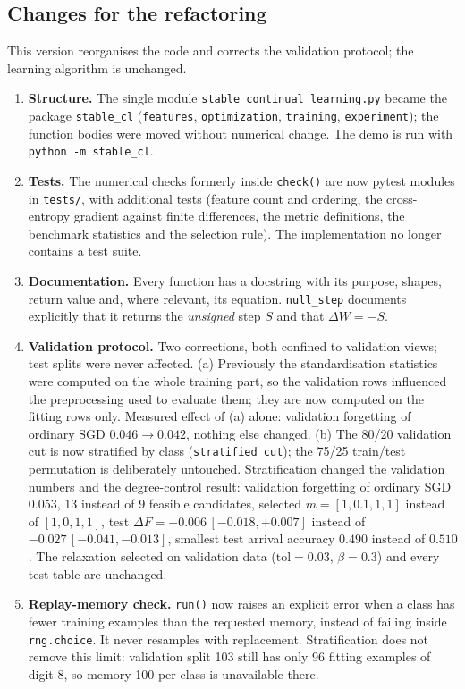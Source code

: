 \documentclass[11pt,a4paper]{article}
\newcommand{\code}[1]{\texttt{#1}}
\begin{document}
\subsection{Changes for the refactoring}

This version reorganises the code and corrects the validation protocol; the learning algorithm is unchanged.
\begin{enumerate}
\item \textbf{Structure.} The single module \code{stable\_continual\_learning.py} became the package \code{stable\_cl} (\code{features}, \code{optimization}, \code{training}, \code{experiment}); the function bodies were moved without numerical change. The demo is run with \code{python -m stable\_cl}.
\item \textbf{Tests.} The numerical checks formerly inside \code{check()} are now pytest modules in \code{tests/}, with additional tests (feature count and ordering, the cross-entropy gradient against finite differences, the metric definitions, the benchmark statistics and the selection rule). The implementation no longer contains a test suite.
\item \textbf{Documentation.} Every function has a docstring with its purpose, shapes, return value and, where relevant, its equation. \code{null\_step} documents explicitly that it returns the \emph{unsigned} step $S$ and that $\Delta W=-S$.
\item \textbf{Validation protocol.} Two corrections, both confined to validation views; test splits were never affected. (a) Previously the standardisation statistics were computed on the whole training part, so the validation rows influenced the preprocessing used to evaluate them; they are now computed on the fitting rows only. Measured effect of (a) alone: validation forgetting of ordinary SGD $0.046\to0.042$, nothing else changed. (b) The 80/20 validation cut is now stratified by class (\code{stratified\_cut}); the 75/25 train/test permutation is deliberately untouched. Stratification changed the validation numbers and the degree-control result: validation forgetting of ordinary SGD $0.053$, 13 instead of 9 feasible candidates, selected $m=[1,0.1,1,1]$ instead of $[1,0,1,1]$, test $\Delta F=-0.006\,[-0.018,+0.007]$ instead of $-0.027\,[-0.041,-0.013]$, smallest test arrival accuracy $0.490$ instead of $0.510$. The relaxation selected on validation data ($\text{tol}=0.03$, $\beta=0.3$) and every test table are unchanged.
\item \textbf{Replay-memory check.} \code{run()} now raises an explicit error when a class has fewer training examples than the requested memory, instead of failing inside \code{rng.choice}. It never resamples with replacement. Stratification does not remove this limit: validation split 103 still has only 96 fitting examples of digit 8, so memory 100 per class is unavailable there.

\end{enumerate}
\end{document}
